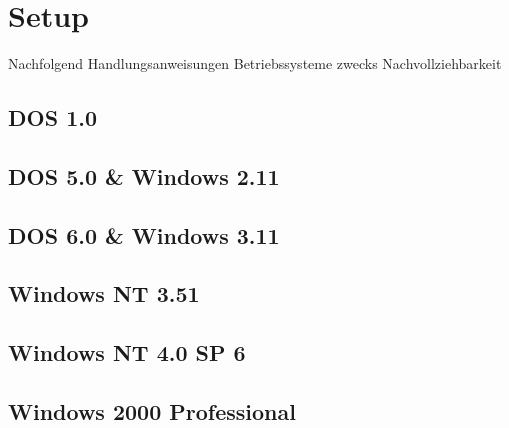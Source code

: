 \chapter{Setup}
\label{chap:implementation}

Nachfolgend Handlungsanweisungen Betriebssysteme zwecks Nachvollziehbarkeit


\section{DOS 1.0}


\section{DOS 5.0 \& Windows 2.11}


\section{DOS 6.0 \& Windows 3.11}


\section{Windows NT 3.51}


\section{Windows NT 4.0 SP 6}


\section{Windows 2000 Professional}
